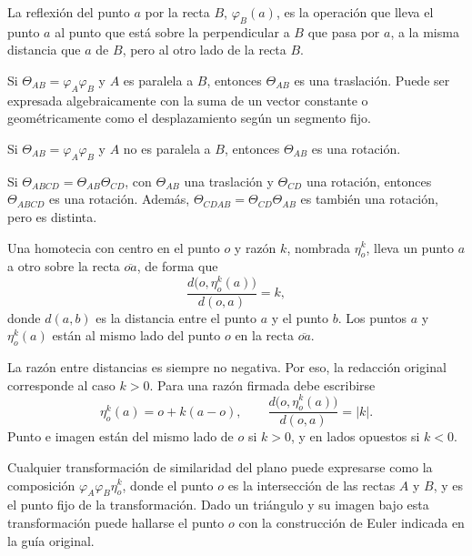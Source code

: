 \begin{enunciado}[Definición 2]
La reflexión del punto \(a\) por la recta \(B\), \(\varphi_B(a)\), es la operación que lleva
el punto \(a\) al punto que está sobre la perpendicular a \(B\) que pasa por \(a\), a la misma
distancia que \(a\) de \(B\), pero al otro lado de la recta \(B\).
\end{enunciado}

\begin{enunciado}[Teorema 3]
Si \(\Theta_{AB}=\varphi_A\varphi_B\) y \(A\) es paralela a \(B\), entonces
\(\Theta_{AB}\) es una traslación. Puede ser expresada algebraicamente con la suma de un
vector constante o geométricamente como el desplazamiento según un segmento fijo.
\end{enunciado}

\begin{enunciado}[Teorema 4]
Si \(\Theta_{AB}=\varphi_A\varphi_B\) y \(A\) no es paralela a \(B\), entonces
\(\Theta_{AB}\) es una rotación.
\end{enunciado}

\begin{enunciado}[Teorema 5]
Si \(\Theta_{ABCD}=\Theta_{AB}\Theta_{CD}\), con \(\Theta_{AB}\) una traslación y
\(\Theta_{CD}\) una rotación, entonces \(\Theta_{ABCD}\) es una rotación. Además,
\(\Theta_{CDAB}=\Theta_{CD}\Theta_{AB}\) es también una rotación, pero es distinta.
\end{enunciado}

\begin{enunciado}[Definición 3]
Una homotecia con centro en el punto \(o\) y razón \(k\), nombrada \(\eta_o^k\), lleva un
punto \(a\) a otro sobre la recta \(\overline{oa}\), de forma que
\[
  \frac{d\bigl(o,\eta_o^k(a)\bigr)}{d(o,a)}=k,
\]
donde \(d(a,b)\) es la distancia entre el punto \(a\) y el punto \(b\). Los puntos \(a\) y
\(\eta_o^k(a)\) están al mismo lado del punto \(o\) en la recta \(\overline{oa}\).
\end{enunciado}

\begin{atencion}
La razón entre distancias es siempre no negativa. Por eso, la redacción original corresponde
al caso \(k>0\). Para una razón firmada debe escribirse
\[
\eta_o^k(a)=o+k(a-o),
\qquad
\frac{d\bigl(o,\eta_o^k(a)\bigr)}{d(o,a)}=|k|.
\]
Punto e imagen están del mismo lado de \(o\) si \(k>0\), y en lados opuestos si \(k<0\).
\end{atencion}

\begin{enunciado}[Teorema 6]
Cualquier transformación de similaridad del plano puede expresarse como la composición
\(\varphi_A\varphi_B\eta_o^k\), donde el punto \(o\) es la intersección de las rectas
\(A\) y \(B\), y es el punto fijo de la transformación. Dado un triángulo y su imagen bajo
esta transformación puede hallarse el punto \(o\) con la construcción de Euler indicada en
la guía original.
\end{enunciado}

